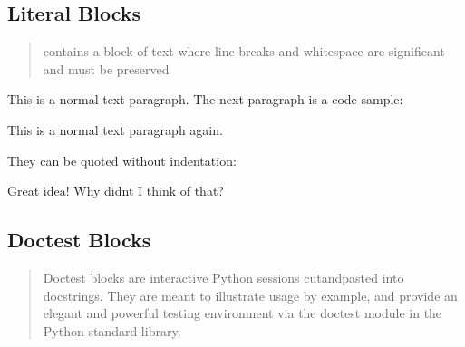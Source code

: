 \documentclass[a4paper,10pt,english]{sphinxmanual}
\begin{document}
\subsection{Literal Blocks}
\label{\detokenize{test1:literal-blocks}}
\sphinxAtStartPar
{}
\begin{quote}

\sphinxAtStartPar
contains a block of text where line breaks and whitespace are significant and must be preserved
\end{quote}

\sphinxAtStartPar
This is a normal text paragraph. The next paragraph is a code sample:

\begin{sphinxVerbatim}[commandchars=\\\{\}]
       
    

    
\end{sphinxVerbatim}

\sphinxAtStartPar
This is a normal text paragraph again.

\sphinxAtStartPar
They can be quoted without indentation:

\begin{sphinxVerbatim}[commandchars=\\\{\}]
\PYGZgt{}\PYGZgt{} Great idea!
\PYGZgt{}
\PYGZgt{} Why didn\PYGZsq{}t I think of that?
\end{sphinxVerbatim}


\subsection{Doctest Blocks}
\label{\detokenize{test1:doctest-blocks}}
\sphinxAtStartPar
{}
\begin{quote}

\sphinxAtStartPar
Doctest blocks are interactive Python sessions cut\sphinxhyphen{}and\sphinxhyphen{}pasted into docstrings. They are meant to illustrate usage by example, and provide an elegant and powerful testing environment via the doctest module in the Python standard library.
\end{quote}
\end{document}
